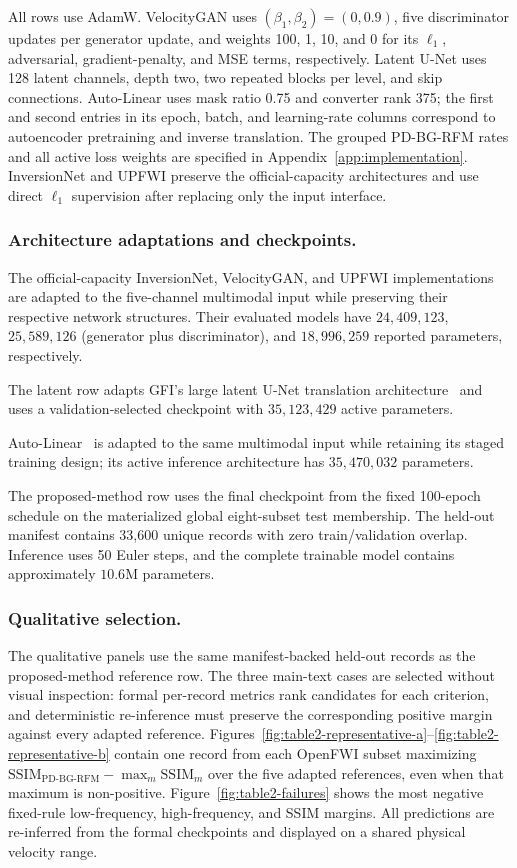 All rows use AdamW. VelocityGAN uses $(\beta_1,\beta_2)=(0,0.9)$, five discriminator updates per generator update, and weights 100, 1, 10, and 0 for its $\ell_1$, adversarial, gradient-penalty, and MSE terms, respectively. Latent U-Net uses 128 latent channels, depth two, two repeated blocks per level, and skip connections. Auto-Linear uses mask ratio 0.75 and converter rank 375; the first and second entries in its epoch, batch, and learning-rate columns correspond to autoencoder pretraining and inverse translation. The grouped PD-BG-RFM rates and all active loss weights are specified in Appendix~\ref{app:implementation}. InversionNet and UPFWI preserve the official-capacity architectures and use direct $\ell_1$ supervision after replacing only the input interface.

\subsubsection{Architecture adaptations and checkpoints.}
The official-capacity InversionNet, VelocityGAN, and UPFWI implementations are adapted to the five-channel multimodal input while preserving their respective network structures. Their evaluated models have $24{,}409{,}123$, $25{,}589{,}126$ (generator plus discriminator), and $18{,}996{,}259$ reported parameters, respectively.

The latent row adapts GFI's large latent U-Net translation architecture~\cite{gupta2025gfi} and uses a validation-selected checkpoint with $35{,}123{,}429$ active parameters.

Auto-Linear~\cite{feng2024autolinear} is adapted to the same multimodal input while retaining its staged training design; its active inference architecture has $35{,}470{,}032$ parameters.

The proposed-method row uses the final checkpoint from the fixed 100-epoch schedule on the materialized global eight-subset test membership. The held-out manifest contains 33,600 unique records with zero train/validation overlap. Inference uses 50 Euler steps, and the complete trainable model contains approximately $10.6$M parameters.

\subsubsection{Qualitative selection.}
The qualitative panels use the same manifest-backed held-out records as the proposed-method reference row. The three main-text cases are selected without visual inspection: formal per-record metrics rank candidates for each criterion, and deterministic re-inference must preserve the corresponding positive margin against every adapted reference. Figures~\ref{fig:table2-representative-a}--\ref{fig:table2-representative-b} contain one record from each OpenFWI subset maximizing $\mathrm{SSIM}_{\mathrm{PD\text{-}BG\text{-}RFM}}-\max_m\mathrm{SSIM}_m$ over the five adapted references, even when that maximum is non-positive. Figure~\ref{fig:table2-failures} shows the most negative fixed-rule low-frequency, high-frequency, and SSIM margins. All predictions are re-inferred from the formal checkpoints and displayed on a shared physical velocity range.

\fi


